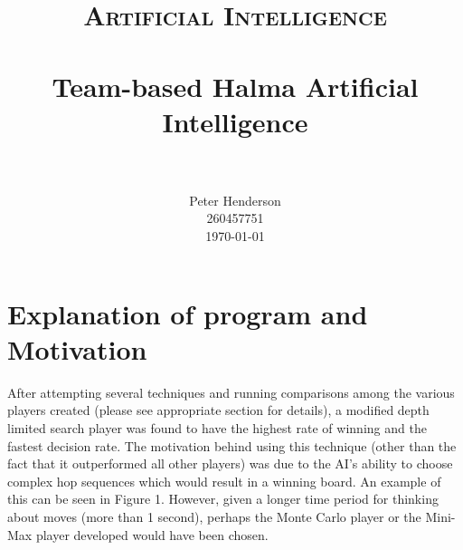 \documentclass[paper=a4, fontsize=11pt]{scrartcl}
\title{
		\usefont{OT1}{bch}{b}{n}
		\normalfont \normalsize \textsc{Artificial Intelligence} \\ [25pt]
		\horrule{0.5pt} \\[0.4cm]
		\huge Team-based Halma Artificial Intelligence\\
		\horrule{2pt} \\[0.5cm]
}
\author{
		\normalfont 								\normalsize
        Peter Henderson\\[-3pt]		\normalsize
        260457751\\ \normalsize
        \today
}
\date{}
\numberwithin{equation}{section}		%
\numberwithin{figure}{section}			%
\numberwithin{table}{section}				%
\begin{document}
\maketitle
\section{Explanation of program and Motivation}

After attempting several techniques and running comparisons among the various players created (please see appropriate section for details), a modified depth limited search player was found to have the highest rate of winning and the fastest decision rate. The motivation behind using this technique (other than the fact that it outperformed all other players) was due to the AI's ability to choose complex hop sequences which would result in a winning board. An example of this can be seen in Figure 1. However, given a longer time period for thinking about moves (more than 1 second), perhaps the Monte Carlo player or the Mini-Max player developed would have been chosen. 
\end{document}

